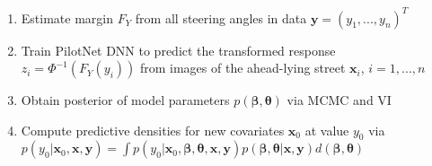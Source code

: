 \documentclass[preview]{standalone}
\begin{document}
\begin{center}
\selectfont
        \begin{enumerate}
        \item Estimate margin $F_Y$ from all steering angles in data $\boldsymbol{y}= (y_1,...,y_n)^T$
        \item Train PilotNet DNN to predict the transformed response $z_i = \Phi^{-1}(F_Y(y_i))$ from images of the ahead-lying street $\boldsymbol{x}_i$, $i = 1,...,n$
        \item Obtain posterior of model parameters $p(\boldsymbol{\beta}, \boldsymbol{\theta})$ via MCMC and VI
        \item Compute predictive densities for new covariates $\boldsymbol{x}_0$ at value $y_0$ via $p(y_0 | \boldsymbol{x}_0, \boldsymbol{x}, \boldsymbol{y}) = \int p(y_0 | \boldsymbol{x}_0, \boldsymbol{\beta}, \boldsymbol{\theta}, \boldsymbol{x}, \boldsymbol{y})p(\boldsymbol{\beta}, \boldsymbol{\theta}| \boldsymbol{x}, \boldsymbol{y})d(\boldsymbol{\beta}, \boldsymbol{\theta})$
        \end{enumerate}
\end{center}
\end{document}
